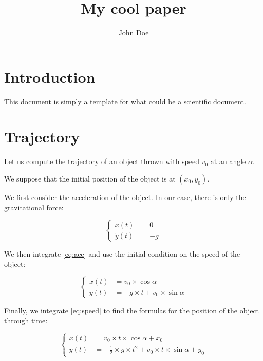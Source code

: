 \documentclass{article}
\title{My cool paper}
\author{John Doe}
\begin{document}
\maketitle

\section{Introduction}

This document is simply a template for what could be a scientific document.

\section{Trajectory}

Let us compute the trajectory of an object thrown with speed $v_0$ at an angle $\alpha$.

We suppose that the initial position of the object is at $(x_0, y_0)$.


We first consider the acceleration of the object.
In our case, there is only the gravitational force:

\begin{equation}\label{eq:acc}
    \begin{cases}
        \ddot{x}(t) &= 0 \\
        \ddot{y}(t) &= -g
    \end{cases}
\end{equation}

We then integrate \cref{eq:acc} and use the initial condition on the speed of the object:

\begin{equation}\label{eq:speed}
    \begin{cases}
        \dot{x}(t) &= v_0 \times \cos \alpha \\
        \dot{y}(t) &= -g \times t + v_0 \times \sin \alpha
    \end{cases}
\end{equation}

Finally, we integrate \cref{eq:speed} to find the formulas for the position of the object through time:

\begin{equation}
    \begin{cases}
        x(t) &= v_0 \times t \times \cos \alpha + x_0 \\
        y(t) &= -\frac{1}{2} \times g  \times t^2 + v_0 \times t \times \sin \alpha + y_0
    \end{cases}
\end{equation}
\end{document}

